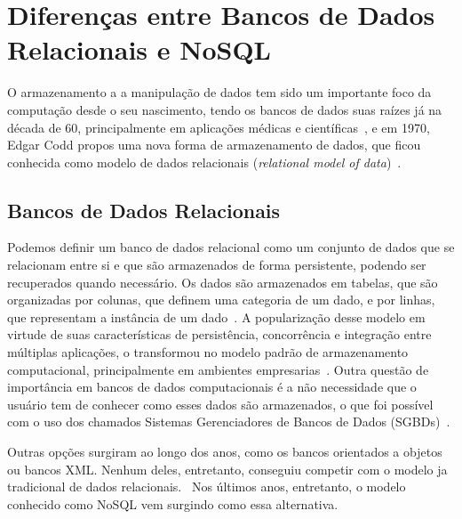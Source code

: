 \chapter{Diferenças entre Bancos de Dados Relacionais e NoSQL}

O armazenamento a a manipulação de dados tem sido um importante foco da computação desde o seu nascimento, tendo os bancos de dados suas raízes já na década de 60, principalmente em aplicações médicas e científicas~\cite{neufeld1986database}, e em 1970, Edgar Codd propos uma nova forma de armazenamento de dados, que ficou conhecida como modelo de dados relacionais (\emph{relational model of data})~\cite{codd1970relational}. 

\section{Bancos de Dados Relacionais}
    Podemos definir um banco de dados relacional como um conjunto de dados que se relacionam entre si e que são armazenados de forma persistente, podendo ser recuperados quando necessário. Os dados são armazenados em tabelas, que são organizadas por colunas, que definem uma categoria de um dado, e por linhas, que representam a instância de um dado~\cite{leavitt2010nosql}. A popularização desse modelo em virtude de suas características de persistência, concorrência e integração entre múltiplas aplicações, o transformou no modelo padrão de armazenamento computacional, principalmente em ambientes empresarias~\cite{pramod}. Outra questão de importância em bancos de dados computacionais é a não necessidade que o usuário tem de conhecer como esses dados são armazenados, o que foi possível com o uso dos chamados Sistemas Gerenciadores de Bancos de Dados (SGBDs)~\cite{jan}.
    
    Outras opções surgiram ao longo dos anos, como os bancos orientados a objetos ou bancos XML. Nenhum deles, entretanto, conseguiu competir com o modelo ja tradicional de dados relacionais.~\cite{pramod} Nos últimos anos, entretanto, o modelo conhecido como NoSQL vem surgindo como essa alternativa.

